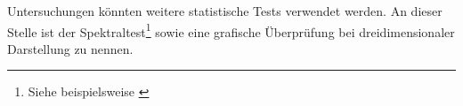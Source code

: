 Untersuchungen könnten weitere statistische Tests verwendet werden. 
An dieser Stelle ist der Spektraltest\footnote{Siehe beispielsweise
  \citep[][S. 45ff]{Brandt2013}} sowie eine grafische Überprüfung
bei dreidimensionaler Darstellung zu nennen.